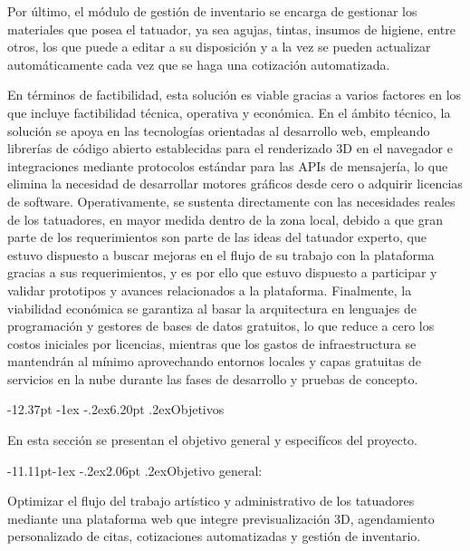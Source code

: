 \documentclass[12pt,letterpaper,oneside]{report}
\makeatletter
\renewcommand\section{\@startsection{section}{1}{\z@}%
  {-12.37pt \@plus -1ex \@minus -.2ex}{6.20pt \@plus.2ex}{\normalfont\large\bfseries}}
\renewcommand\subsection{\@startsection{subsection}{2}{\z@}%
  {-11.11pt\@plus -1ex \@minus -.2ex}{2.06pt \@plus .2ex}{\normalfont\normalsize\bfseries}}
\makeatother
\begin{document}
Por último, el módulo de gestión de inventario se encarga de gestionar los materiales que posea el tatuador, ya sea agujas, tintas, insumos de higiene, entre otros, los que puede a editar a su disposición y a la vez se pueden actualizar automáticamente cada vez que se haga una cotización automatizada.

En términos de factibilidad, esta solución es viable gracias a varios factores en los que incluye factibilidad técnica, operativa y económica. En el ámbito técnico, la solución se apoya en las tecnologías orientadas al desarrollo web, empleando librerías de código abierto establecidas para el renderizado 3D en el navegador e integraciones mediante protocolos estándar para las APIs de mensajería, lo que elimina la necesidad de desarrollar motores gráficos desde cero o adquirir licencias de software. Operativamente, se sustenta directamente con las necesidades reales de los tatuadores, en mayor medida dentro de la zona local, debido a que gran parte de los requerimientos son parte de las ideas del tatuador experto, que estuvo dispuesto a buscar mejoras en el flujo de su trabajo con la plataforma gracias a sus requerimientos, y es por ello que estuvo dispuesto a participar y validar prototipos y avances relacionados a la plataforma. Finalmente, la viabilidad económica se garantiza al basar la arquitectura en lenguajes de programación y gestores de bases de datos gratuitos, lo que reduce a cero los costos iniciales por licencias, mientras que los gastos de infraestructura se mantendrán al mínimo aprovechando entornos locales y capas gratuitas de servicios en la nube durante las fases de desarrollo y pruebas de concepto.

\section{Objetivos}

En esta sección se presentan el objetivo general y especifícos del proyecto.

\subsection{Objetivo general:}

Optimizar el flujo del trabajo artístico y administrativo de los tatuadores mediante una plataforma web que integre previsualización 3D, agendamiento personalizado de citas, cotizaciones automatizadas y gestión de inventario.

\vspace{\parskip}
\end{document}
